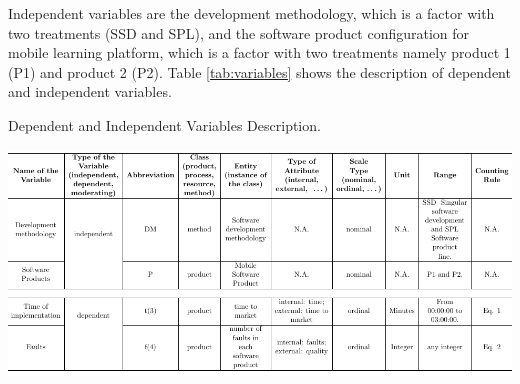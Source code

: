 Independent variables are the development methodology, which is a factor with two treatments (SSD and SPL), and the software product configuration for mobile learning platform, which is a factor with two treatments namely product 1 (P1) and product 2 (P2). Table \ref{tab:variables} shows the description of dependent and independent variables.


\begin{table}
\centering
\caption{\label{tab:variables}Dependent and Independent Variables Description.}
\includegraphics[scale=0.75]{figures/section4/tab_n.pdf}




\end{table}
